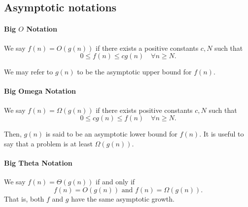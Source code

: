\subsection{Asymptotic notations}
\paragraph{Big \(O\) Notation}
We say \(f(n) = O(g(n))\) if there exists a positive constants \(c, N\)
such that
\[0 \leq f(n) \leq c g(n) \quad \forall n \geq N.\]

We may refer to \(g(n)\) to be the asymptotic upper bound for \(f(n)\).

\paragraph{Big Omega Notation}
We say \(f(n) = \Omega(g(n))\) if there exists positive constants \(c, N\)
such that 
\[0 \leq c g(n) \leq f(n) \quad \forall n \geq N.\]

Then, \(g(n)\) is said to be an asymptotic lower bound for \(f(n)\).
It is useful to say that a problem is at least \(\Omega(g(n))\).

\paragraph{Big Theta Notation} 
We say \(f(n) = \Theta(g(n))\) if and only if 
\[f(n) = O(g(n)) \text{ and } f(n)=\Omega(g(n)).\]
That is, both \(f\) and \(g\) have the same asymptotic growth.